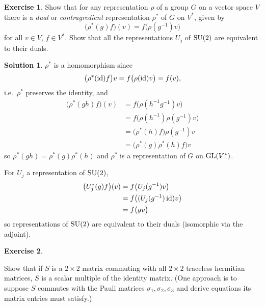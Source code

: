 \documentclass[11pt, a4paper]{report}
\theoremstyle{definition}
\newtheorem{exercise}{Exercise}[part]
\newtheorem{solution}{Solution}[part]
\newenvironment{ex}{\begin{exercise}}{\end{exercise}\pagebreak[1]}
\newenvironment{sol}{\begin{solution}}{\end{solution}\pagebreak[3]}
\newcommand*{\GL}{\ensuremath\text{GL}}
\newcommand*{\SU}{\ensuremath\text{SU}}
\newcommand*{\op}[1]{\ensuremath\mathop{}\mathopen{}#1}
\newcommand*{\id}{\op{\mathrm{id}}}
\begin{document}
\begin{ex}

Show that for any representation $\rho$ of a group $G$ on a vector space $V$ there is a \emph{dual} or \emph{contragredient} representation $\rho^*$ of $G$ on $V^*$, given by
\[
    \bigl( \rho^*(g) f \bigr) (v) = f \bigl( \rho(g^{-1}) v \bigr)
\]
for all $v \in V$, $f \in V^*$.
Show that all the representations $U_j$ of $\SU(2)$ are equivalent to their duals.

\end{ex}

\begin{sol}

$\rho^*$ is a homomorphism since
\[
    \bigl( \rho^*(\id) f \bigr) v = f \bigl(\rho(\id) v \bigr) = f(v),
\]
i.e.\ $\rho^*$ preserves the identity, and
\begin{align*}
    \bigl( \rho^*(gh) f \bigr) (v) &= f \bigl( \rho(h^{-1} g^{-1}) v \bigr) \\
        &= f \bigl( \rho(h^{-1}) \rho(g^{-1}) v \bigr) \\
        &= \bigl( \rho^*(h) f \bigr) \rho(g^{-1}) v \\
        &= \bigl( \rho^*(g) \rho^*(h) f \bigr) v
\end{align*}
so $\rho^*(gh) = \rho^*(g) \rho^*(h)$ and $\rho^*$ is a representation of $G$ on $\GL(V^*)$.

For $U_j$ a representation of $\SU(2)$,
\begin{align*}
    \bigl( U_j^*(g) f \bigr) (v) &= f \bigl( U_j(g^{-1}) v \bigr) \\
                                 &= f \bigl( (U_j(g^{-1}) \id) v \bigr) \\
                                 &= f \bigl( g v \bigr)
\end{align*}
so representations of $\SU(2)$ are equivalent to their duals (isomorphic via the adjoint).

\end{sol}

\begin{ex}\label{ex:commutativescalarmultipleidentity}

Show that if $S$ is a $2 \times 2$ matrix commuting with all $2 \times 2$ traceless hermitian matrices, $S$ is a scalar multiple of the identity matrix.
(One approach is to suppose $S$ commutes with the Pauli matrices $\sigma_1, \sigma_2, \sigma_3$ and derive equations its matrix entries must satisfy.)

\end{ex}
\end{document}

